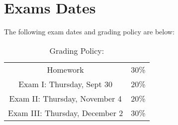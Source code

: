 \documentclass[11pt]{article}
\begin{document}
\section{Exams Dates} 
The following exam dates and grading policy are below:

\begin{table}[h!]
\caption{Grading Policy:}
\begin{center}
\begin{tabular}{cc}
Homework &30\%\\
Exam I:  Thursday, Sept 30 &20\%\\
Exam  II: Thursday, November 4 & 20\%\\
Exam III:  Thursday, December 2 & 30\%\\
\end{tabular}
\end{center}
\label{default}
\end{table}%
\end{document}
